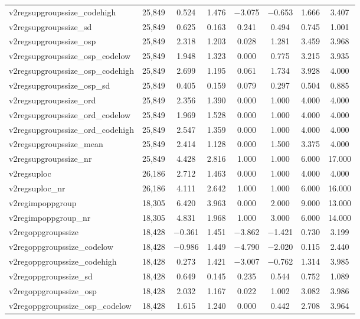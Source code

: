 \begin{table}[!htbp]
\begin{tabular}{@{\extracolsep{5pt}}lccccccc}
v2regsupgroupssize\_codehigh & 25,849 & 0.524 & 1.476 & $-$3.075 & $-$0.653 & 1.666 & 3.407 \\ 
v2regsupgroupssize\_sd & 25,849 & 0.625 & 0.163 & 0.241 & 0.494 & 0.745 & 1.001 \\ 
v2regsupgroupssize\_osp & 25,849 & 2.318 & 1.203 & 0.028 & 1.281 & 3.459 & 3.968 \\ 
v2regsupgroupssize\_osp\_codelow & 25,849 & 1.948 & 1.323 & 0.000 & 0.775 & 3.215 & 3.935 \\ 
v2regsupgroupssize\_osp\_codehigh & 25,849 & 2.699 & 1.195 & 0.061 & 1.734 & 3.928 & 4.000 \\ 
v2regsupgroupssize\_osp\_sd & 25,849 & 0.405 & 0.159 & 0.079 & 0.297 & 0.504 & 0.885 \\ 
v2regsupgroupssize\_ord & 25,849 & 2.356 & 1.390 & 0.000 & 1.000 & 4.000 & 4.000 \\ 
v2regsupgroupssize\_ord\_codelow & 25,849 & 1.969 & 1.528 & 0.000 & 1.000 & 4.000 & 4.000 \\ 
v2regsupgroupssize\_ord\_codehigh & 25,849 & 2.547 & 1.359 & 0.000 & 1.000 & 4.000 & 4.000 \\ 
v2regsupgroupssize\_mean & 25,849 & 2.414 & 1.128 & 0.000 & 1.500 & 3.375 & 4.000 \\ 
v2regsupgroupssize\_nr & 25,849 & 4.428 & 2.816 & 1.000 & 1.000 & 6.000 & 17.000 \\ 
v2regsuploc & 26,186 & 2.712 & 1.463 & 0.000 & 1.000 & 4.000 & 4.000 \\ 
v2regsuploc\_nr & 26,186 & 4.111 & 2.642 & 1.000 & 1.000 & 6.000 & 16.000 \\ 
v2regimpoppgroup & 18,305 & 6.420 & 3.963 & 0.000 & 2.000 & 9.000 & 13.000 \\ 
v2regimpoppgroup\_nr & 18,305 & 4.831 & 1.968 & 1.000 & 3.000 & 6.000 & 14.000 \\ 
v2regoppgroupssize & 18,428 & $-$0.361 & 1.451 & $-$3.862 & $-$1.421 & 0.730 & 3.199 \\ 
v2regoppgroupssize\_codelow & 18,428 & $-$0.986 & 1.449 & $-$4.790 & $-$2.020 & 0.115 & 2.440 \\ 
v2regoppgroupssize\_codehigh & 18,428 & 0.273 & 1.421 & $-$3.007 & $-$0.762 & 1.314 & 3.985 \\ 
v2regoppgroupssize\_sd & 18,428 & 0.649 & 0.145 & 0.235 & 0.544 & 0.752 & 1.089 \\ 
v2regoppgroupssize\_osp & 18,428 & 2.032 & 1.167 & 0.022 & 1.002 & 3.082 & 3.986 \\ 
v2regoppgroupssize\_osp\_codelow & 18,428 & 1.615 & 1.240 & 0.000 & 0.442 & 2.708 & 3.964 \\ 

\end{tabular}
\end{table}
